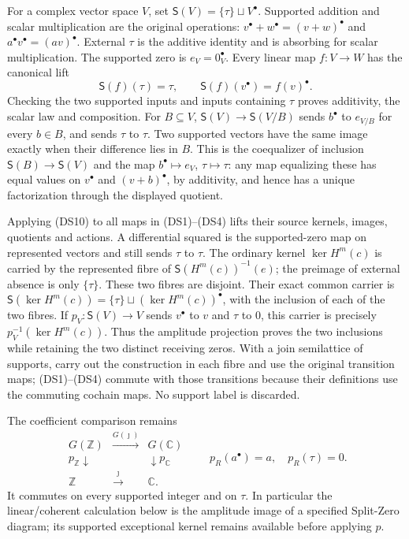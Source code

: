 For a complex vector space $V$, set $\mathsf S(V)=\{\tau\}\sqcup V^\bullet$.
Supported addition and scalar multiplication are the original operations:
$v^\bullet+w^\bullet=(v+w)^\bullet$ and
$a^\bullet v^\bullet=(av)^\bullet$.  External $\tau$ is the additive
identity and is absorbing for scalar multiplication.  The supported
zero is $e_V=0_V^\bullet$.  Every linear map $f:V\to W$ has the
canonical lift
\[
 \mathsf S(f)(\tau)=\tau,\qquad
 \mathsf S(f)(v^\bullet)=f(v)^\bullet.
 \tag{DS10}
\]
Checking the two supported inputs and inputs containing $\tau$ proves
additivity, the scalar law and composition.  For $B\subseteq V$,
$\mathsf S(V)\to\mathsf S(V/B)$ sends $b^\bullet$ to $e_{V/B}$ for
every $b\in B$, and sends $\tau$ to $\tau$.  Two supported vectors
have the same image exactly when their difference lies in $B$.
This is the coequalizer of inclusion $\mathsf S(B)\to\mathsf S(V)$
and the map $b^\bullet\mapsto e_V$, $\tau\mapsto\tau$: any map
equalizing these has equal values on $v^\bullet$ and $(v+b)^\bullet$,
by additivity, and hence has a unique factorization through the
displayed quotient.

Applying (DS10) to all maps in (DS1)--(DS4) lifts their source kernels,
images, quotients and actions.  A differential squared is the
supported-zero map on represented vectors and still sends $\tau$ to
$\tau$.  The ordinary kernel $\ker H^m(c)$ is carried by the
represented fibre of $\mathsf S(H^m(c))^{-1}(e)$; the preimage of
external absence is only $\{\tau\}$.  These two fibres are disjoint.
Their exact common carrier is
$\mathsf S(\ker H^m(c))=\{\tau\}\sqcup(\ker H^m(c))^\bullet$,
with the inclusion of each of the two fibres.  If
$p_V:\mathsf S(V)\to V$ sends $v^\bullet$ to $v$ and $\tau$ to
$0$, this carrier is precisely $p_V^{-1}(\ker H^m(c))$.
Thus the amplitude projection proves the two inclusions while
retaining the two distinct receiving zeros.  With a join semilattice
of supports, carry out the construction
in each fibre and use the original transition maps; (DS1)--(DS4) commute
with those transitions because their definitions use the commuting
cochain maps.  No support label is discarded.

The coefficient comparison remains
\[
 \begin{array}{ccc}
 G(\mathbb Z)&\xrightarrow{G(\jmath)}&G(\mathbb C)\\
 p_{\mathbb Z}\downarrow&&\downarrow p_{\mathbb C}\\
 \mathbb Z&\xrightarrow{\jmath}&\mathbb C.
 \end{array}\qquad
 p_R(a^\bullet)=a,\quad p_R(\tau)=0.
 \tag{DS11}
\]
It commutes on every supported integer and on $\tau$.  In particular
the linear/coherent calculation below is the amplitude image of a
specified Split-Zero diagram; its supported exceptional kernel remains
available before applying $p$.


